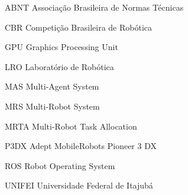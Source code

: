 \renewcommand{\nomname}{\listadesiglasname}
\pdfbookmark[0]{\nomname}{las}
\cleardoublepage
\begin{siglas}
    \item[ABNT] Associação Brasileira de Normas Técnicas
    \item[CBR] Competição Brasileira de Robótica
    \item[GPU] Graphics Processing Unit
    \item[LRO] Laboratório de Robótica
    \item[MAS] Multi-Agent System
    \item[MRS] Multi-Robot System
    \item[MRTA] Multi-Robot Task Allocation
    \item[P3DX] Adept MobileRobots Pioneer 3 DX
    \item[ROS] Robot Operating System
    \item[UNIFEI] Universidade Federal de Itajubá
\end{siglas}